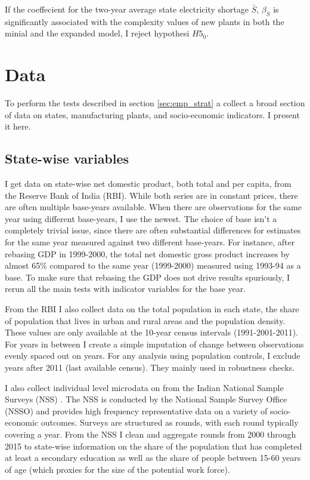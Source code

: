 \documentclass[11pt]{article}
\begin{document}
If the coeffecient for the two-year average state electricity shortage $\bar{S}$, $\beta_{\bar{S}}$ is significantly associated with the complexity values of new plants in both the minial and the expanded model, I reject hypothesi $H5_0$.


\section{Data}%
\label{sub:data}

To perform the tests described in section \ref{sec:emp_strat} a collect a broad section of data on states, manufacturing plants, and socio-economic indicators. I present it here.

\subsection{State-wise variables}%
\label{sub:state_wise_variables}

I get data on state-wise net domestic product, both total and per capita, from the Reserve Bank of India (RBI). While both series are in constant prices, there are often multiple base-years available. When there are observations for the same year using different base-years, I use the newest. The choice of base isn't a completely trivial issue, since there are often substantial differences for estimates for the same year measured against two different base-years. For instance, after rebasing GDP in 1999-2000, the total net domestic gross product increases by almost 65\% compared to the same year (1999-2000) measured using 1993-94 as a base. To make sure that rebasing the GDP does not drive results spuriously, I rerun all the main tests with indicator variables for the base year.

From the RBI I also collect data on the total population in each state, the share of population that lives in urban and rural areas and the population density. These values are only available at the 10-year census intervals (1991-2001-2011). For years in between I create a simple imputation of change between observations evenly spaced out on years. For any analysis using population controls, I exclude years after 2011 (last available census). They mainly used in robustness checks.

I also collect individual level microdata on from the Indian National Sample Surveys (NSS) \citep{nsso_national_2000}. The NSS is conducted by the National Sample Survey Office (NSSO) and provides high frequency representative data on a variety of socio-economic outcomes. Surveys are structured as rounds, with each round typically covering a year. From the NSS I clean and aggregate rounds from 2000 through 2015 to state-wise information on the share of the population that has completed at least a secondary education as well as the share of people between 15-60 years of age (which proxies for the size of the potential work force).
\end{document}
